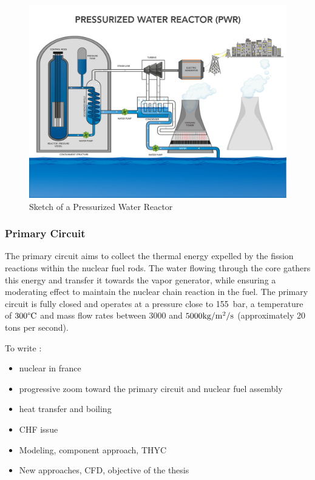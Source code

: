 \begin{figure}[!h]
\centering
\includegraphics[width=0.7\linewidth]{img/intro/pwr_sketch.png}
\caption{Sketch of a Pressurized Water Reactor \cite{office_nuclear_energy}}
\label{fig:pwr_sketch}
\end{figure}



\subsubsection{Primary Circuit}

The primary circuit aims to collect the thermal energy expelled by the fission reactions within the nuclear fuel rods. The water flowing through the core gathers this energy and transfer it towards the vapor generator, while ensuring a moderating effect to maintain the nuclear chain reaction in the fuel. The primary circuit is fully closed and operates at a pressure close to 155\ bar, a temperature of $300\degree\mathrm{C}$ and mass flow rates between $3000$ and $5000 \text{kg/m$^{2}$/s}$ (approximately 20 tons per second).  


To write :

\begin{itemize}
\item nuclear in france
\item progressive zoom toward the primary circuit and nuclear fuel assembly
\item heat transfer and boiling
\item CHF issue
\item Modeling, component approach, THYC
\item New approaches, CFD, objective of the thesis
\end{itemize}
